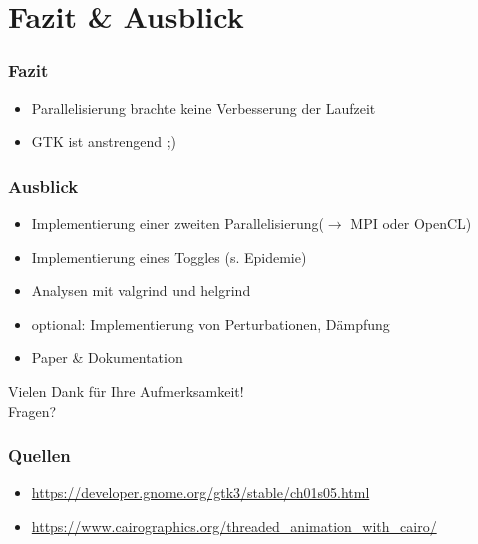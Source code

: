 \documentclass[xcolor=dvipsnames]{beamer}
\begin{document}
\section{Fazit \& Ausblick}
\frame{\tableofcontents[current]}

\begin{frame}\frametitle{Fazit}
	\begin{itemize}
		\item Parallelisierung brachte keine Verbesserung der Laufzeit
		\item GTK ist anstrengend ;)
	\end{itemize}
\end{frame}

\begin{frame}\frametitle{Ausblick}
	\begin{itemize}
		\item Implementierung einer zweiten Parallelisierung\newline($\rightarrow$ MPI oder OpenCL)
		\item Implementierung eines Toggles (s. Epidemie)
		\item Analysen mit valgrind und helgrind
		\item optional: Implementierung von Perturbationen, Dämpfung
		\item Paper \& Dokumentation
	\end{itemize}
\end{frame}

\begin{frame}
	\centering
	\textcolor{htwgreen}{{\LARGE Vielen Dank für Ihre Aufmerksamkeit!\\[6ex] Fragen?}}
\end{frame}

\begin{frame}\frametitle{Quellen}
	\footnotesize
	\begin{itemize}
		\item \url{https://developer.gnome.org/gtk3/stable/ch01s05.html}
		\item \url{https://www.cairographics.org/threaded_animation_with_cairo/}
	\end{itemize}
\end{frame}
\end{document}
